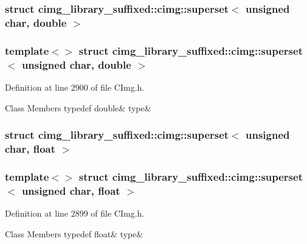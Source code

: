 \subsubsection{struct cimg\+\_\+library\+\_\+suffixed\+:\+:cimg\+:\+:superset$<$ unsigned char, double $>$}
\subsubsection*{template$<$$>$\newline
struct cimg\+\_\+library\+\_\+suffixed\+::cimg\+::superset$<$ unsigned char, double $>$}



Definition at line 2900 of file C\+Img.\+h.

\begin{DoxyFields}{Class Members}
\mbox{\label{namespacecimg__library__suffixed_1_1cimg_aa3fa9601d84938a96d0ff34b45c4dc28}} 
typedef double&
type&
\\
\hline

\end{DoxyFields}
\label{structcimg__library__suffixed_1_1cimg_1_1superset_3_01unsigned_01char_00_01float_01_4}
\subsubsection{struct cimg\+\_\+library\+\_\+suffixed\+:\+:cimg\+:\+:superset$<$ unsigned char, float $>$}
\subsubsection*{template$<$$>$\newline
struct cimg\+\_\+library\+\_\+suffixed\+::cimg\+::superset$<$ unsigned char, float $>$}



Definition at line 2899 of file C\+Img.\+h.

\begin{DoxyFields}{Class Members}
\mbox{\label{namespacecimg__library__suffixed_1_1cimg_a5bbbc84442f664f77c9e78fa5e1eaf92}} 
typedef float&
type&
\\
\hline

\end{DoxyFields}
\label{structcimg__library__suffixed_1_1cimg_1_1superset_3_01unsigned_01char_00_01int_01_4}
